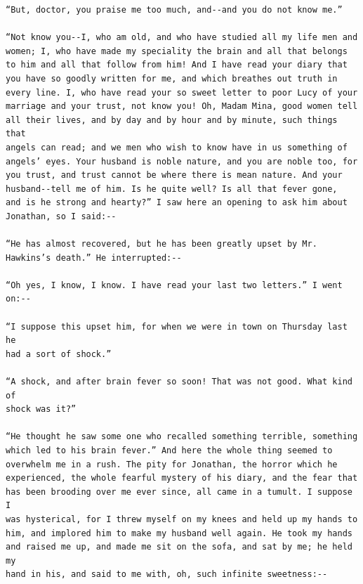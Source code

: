 \documentclass{article}
\begin{document}
\begin{verbatim}
“But, doctor, you praise me too much, and--and you do not know me.”

“Not know you--I, who am old, and who have studied all my life men and
women; I, who have made my speciality the brain and all that belongs
to him and all that follow from him! And I have read your diary that
you have so goodly written for me, and which breathes out truth in
every line. I, who have read your so sweet letter to poor Lucy of your
marriage and your trust, not know you! Oh, Madam Mina, good women tell
all their lives, and by day and by hour and by minute, such things that
angels can read; and we men who wish to know have in us something of
angels’ eyes. Your husband is noble nature, and you are noble too, for
you trust, and trust cannot be where there is mean nature. And your
husband--tell me of him. Is he quite well? Is all that fever gone,
and is he strong and hearty?” I saw here an opening to ask him about
Jonathan, so I said:--

“He has almost recovered, but he has been greatly upset by Mr.
Hawkins’s death.” He interrupted:--

“Oh yes, I know, I know. I have read your last two letters.” I went
on:--

“I suppose this upset him, for when we were in town on Thursday last he
had a sort of shock.”

“A shock, and after brain fever so soon! That was not good. What kind of
shock was it?”

“He thought he saw some one who recalled something terrible, something
which led to his brain fever.” And here the whole thing seemed to
overwhelm me in a rush. The pity for Jonathan, the horror which he
experienced, the whole fearful mystery of his diary, and the fear that
has been brooding over me ever since, all came in a tumult. I suppose I
was hysterical, for I threw myself on my knees and held up my hands to
him, and implored him to make my husband well again. He took my hands
and raised me up, and made me sit on the sofa, and sat by me; he held my
hand in his, and said to me with, oh, such infinite sweetness:--


\end{verbatim}
\end{document}
